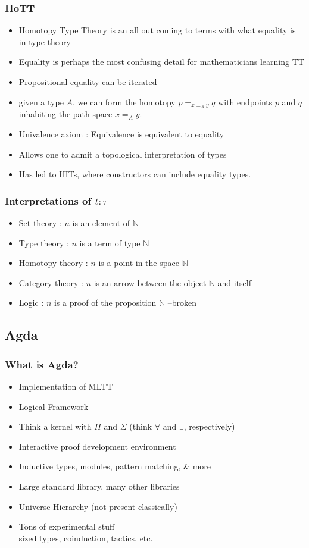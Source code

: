 \documentclass[9pt]{beamer}
\begin{document}
\begin{frame}
\frametitle{HoTT}

\begin{itemize}
  \item Homotopy Type Theory is an all out coming to terms with what equality is
    in type theory
  \item Equality is perhaps the most confusing detail for mathematicians
    learning TT
  \item Propositional equality can be iterated
  \item given a type $A$, we can form the homotopy $p=_{x=_{A} y}q$
with endpoints $p$ and $q$ inhabiting the path space $x=_{A} y$.
  \item Univalence axiom : Equivalence is equivalent to equality
  \item Allows one to admit a topological interpretation of types
  \item Has led to HITs, where constructors can include
    equality types.  
\end{itemize}
\end{frame}

\begin{frame}
\frametitle{Interpretations of $t : \tau$}
\begin{itemize}
\item Set theory : $n$ is an element of $\mathbb{N}$
\item Type theory : $n$ is a term of type $\mathbb{N}$
\item Homotopy theory : $n$ is a point in the space $\mathbb{N}$
\item Category theory : $n$ is an arrow between the object $\mathbb{N}$ and itself
\item Logic : $n$ is a proof of the proposition $\mathbb{N}$ --broken
\end{itemize}
\end{frame}

\subsection{Agda}

\begin{frame}
\frametitle{What is Agda?}

\begin{itemize}
\item Implementation of MLTT
\item Logical Framework
\item Think a kernel with $\Pi$ and $\Sigma$ (think $\forall$ and $\exists$, respectively)
\item Interactive proof development environment
\item Inductive types, modules, pattern matching, \& more
\item Large standard library, many other libraries
\item Universe Hierarchy (not present classically)
\item Tons of experimental stuff\\
      sized types, coinduction, tactics, etc.
\end{itemize}
\end{frame}
\end{document}
